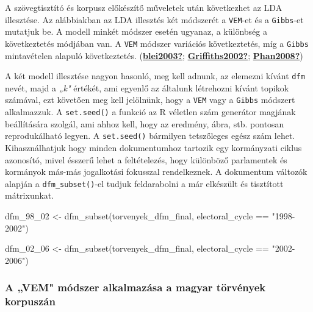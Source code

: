 \documentclass[
]{book}
\newenvironment{Shaded}{\begin{snugshade}}{\end{snugshade}}
\newcommand{\FunctionTok}[1]{\textcolor[rgb]{0.00,0.00,0.00}{#1}}
\newcommand{\NormalTok}[1]{#1}
\newcommand{\OtherTok}[1]{\textcolor[rgb]{0.56,0.35,0.01}{#1}}
\newcommand{\SpecialCharTok}[1]{\textcolor[rgb]{0.00,0.00,0.00}{#1}}
\newcommand{\StringTok}[1]{\textcolor[rgb]{0.31,0.60,0.02}{#1}}
\begin{document}
A szövegtisztító és korpusz előkészítő műveletek után következhet az LDA
illesztése. Az alábbiakban az LDA illesztés két módszerét a
\texttt{VEM}-et és a \texttt{Gibbs}-et mutatjuk be. A modell minkét
módszer esetén ugyanaz, a különbség a következtetés módjában van. A
\texttt{VEM} módszer variációs következtetés, míg a \texttt{Gibbs}
mintavételen alapuló következtetés.
(\protect\hyperlink{ref-blei2003}{\textbf{blei2003?}};
\protect\hyperlink{ref-Griffiths2002}{\textbf{Griffiths2002?}};
\protect\hyperlink{ref-Phan2008}{\textbf{Phan2008?}})

A két modell illesztése nagyon hasonló, meg kell adnunk, az elemezni
kívánt \texttt{dfm} nevét, majd a \emph{„k"} értékét, ami egyenlő az
általunk létrehozni kívánt topikok számával, ezt követően meg kell
jelölnünk, hogy a \texttt{VEM} vagy a \texttt{Gibbs} módszert
alkalmazzuk. A \texttt{set.seed()} a funkció az R véletlen szám
generátor magjának beállítására szolgál, ami ahhoz kell, hogy az
eredmény, ábra, stb. pontosan reprodukálható legyen. A
\texttt{set.seed()} bármilyen tetszőleges egész szám lehet.
Kihasználhatjuk hogy minden dokumentumhoz tartozik egy kormányzati
ciklus azonosító, mivel ésszerű lehet a feltételezés, hogy különböző
parlamentek és kormányok más-más jogalkotási fokusszal rendelkeznek. A
dokumentum változók alapján a \texttt{dfm\_subset()}-el tudjuk
feldarabolni a már elkészült és tisztított mátrixunkat.

\begin{Shaded}
\begin{Highlighting}[]
\NormalTok{dfm\_98\_02 }\OtherTok{\textless{}{-}} \FunctionTok{dfm\_subset}\NormalTok{(torvenyek\_dfm\_final, electoral\_cycle }\SpecialCharTok{==} \StringTok{"1998{-}2002"}\NormalTok{)}

\NormalTok{dfm\_02\_06 }\OtherTok{\textless{}{-}} \FunctionTok{dfm\_subset}\NormalTok{(torvenyek\_dfm\_final, electoral\_cycle }\SpecialCharTok{==} \StringTok{"2002{-}2006"}\NormalTok{)}
\end{Highlighting}
\end{Shaded}

\hypertarget{a-vem-muxf3dszer-alkalmazuxe1sa-a-magyar-tuxf6rvuxe9nyek-korpuszuxe1n}{%
\subsubsection{A „VEM" módszer alkalmazása a magyar törvények
korpuszán}\label{a-vem-muxf3dszer-alkalmazuxe1sa-a-magyar-tuxf6rvuxe9nyek-korpuszuxe1n}}
\end{document}
